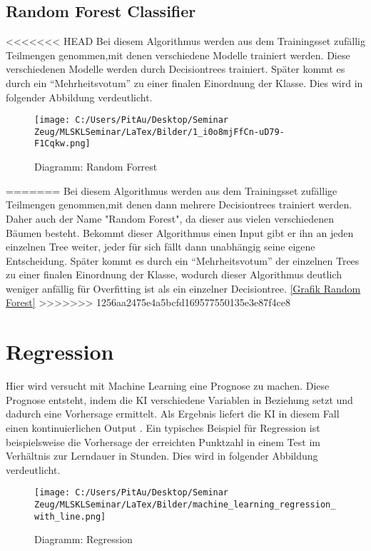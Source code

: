 \subsection{Random Forest Classifier}
\label{sec:RFC}
<<<<<<< HEAD
Bei diesem Algorithmus  werden aus dem Trainingsset zufällig Teilmengen genommen,mit denen verschiedene Modelle trainiert werden\cite[S.~256]{MB}. Diese verschiedenen Modelle werden durch Decisiontrees trainiert. Später kommt es durch ein “Mehrheitsvotum” zu einer finalen Einordnung der Klasse\cite{MED}.  Dies wird in folgender Abbildung verdeutlicht.

\begin{figure}
	\texttt{[image: C:/Users/PitAu/Desktop/Seminar Zeug/MLSKLSeminar/LaTex/Bilder/1\_i0o8mjFfCn-uD79-F1Cqkw.png]}
	\caption{Diagramm: Random Forrest}
\end{figure}
=======
Bei diesem Algorithmus  werden aus dem Trainingsset zufällige Teilmengen genommen,mit denen dann mehrere Decisiontrees trainiert werden. Daher auch der Name "Random Forest", da dieser aus vielen verschiedenen Bäumen besteht\cite[p.~256]{MB}. Bekommt dieser Algorithmus einen Input gibt er ihn an jeden einzelnen Tree weiter, jeder für sich fällt dann unabhängig seine eigene Entscheidung. Später kommt es durch ein “Mehrheitsvotum” der einzelnen Trees zu einer finalen Einordnung der Klasse, wodurch dieser Algorithmus deutlich weniger anfällig für Overfitting ist als ein einzelner Decisiontree\cite{MED}. \hyperlink{einführungMachineLearning}{[Grafik Random Forest]}
>>>>>>> 1256aa2475e4a5bcfd169577550135e3e87f4ce8

\section{Regression}
\label{sec:regression}
Hier wird versucht mit Machine Learning eine Prognose zu machen. Diese Prognose entsteht, indem die KI verschiedene Variablen in Beziehung setzt und dadurch eine Vorhersage ermittelt. Als Ergebnis liefert die KI in diesem Fall einen kontinuierlichen Output \cite[S.~4.]{WML}.  Ein typisches Beispiel für Regression ist beispielsweise die Vorhersage der erreichten Punktzahl in einem Test im Verhältnis zur Lerndauer in Stunden.  Dies wird in folgender Abbildung verdeutlicht.
\begin{figure}
	\texttt{[image: C:/Users/PitAu/Desktop/Seminar Zeug/MLSKLSeminar/LaTex/Bilder/machine\_learning\_regression\_with\_line.png]}
	\caption{Diagramm: Regression}
\end{figure}

